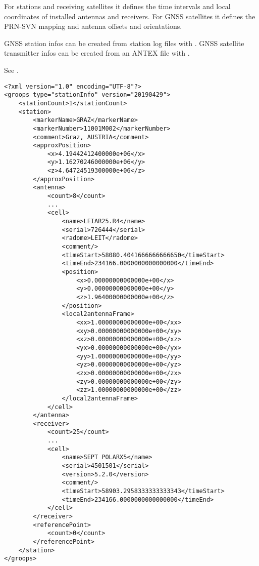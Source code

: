 For stations and receiving satellites it defines the time intervals and
local coordinates of installed antennas and receivers.
For GNSS satellites it defines the PRN-SVN mapping and antenna offsets
and orientations.

GNSS station infos can be created from station log files with
. GNSS satellite transmitter infos
can be created from an ANTEX file with .

See .

\begin{verbatim}
<?xml version="1.0" encoding="UTF-8"?>
<groops type="stationInfo" version="20190429">
    <stationCount>1</stationCount>
    <station>
        <markerName>GRAZ</markerName>
        <markerNumber>11001M002</markerNumber>
        <comment>Graz, AUSTRIA</comment>
        <approxPosition>
            <x>4.19442412400000e+06</x>
            <y>1.16270246000000e+06</y>
            <z>4.64724519300000e+06</z>
        </approxPosition>
        <antenna>
            <count>8</count>
            ...
            <cell>
                <name>LEIAR25.R4</name>
                <serial>726444</serial>
                <radome>LEIT</radome>
                <comment/>
                <timeStart>58080.4041666666666650</timeStart>
                <timeEnd>234166.0000000000000000</timeEnd>
                <position>
                    <x>0.00000000000000e+00</x>
                    <y>0.00000000000000e+00</y>
                    <z>1.96400000000000e+00</z>
                </position>
                <local2antennaFrame>
                    <xx>1.00000000000000e+00</xx>
                    <xy>0.00000000000000e+00</xy>
                    <xz>0.00000000000000e+00</xz>
                    <yx>0.00000000000000e+00</yx>
                    <yy>1.00000000000000e+00</yy>
                    <yz>0.00000000000000e+00</yz>
                    <zx>0.00000000000000e+00</zx>
                    <zy>0.00000000000000e+00</zy>
                    <zz>1.00000000000000e+00</zz>
                </local2antennaFrame>
            </cell>
        </antenna>
        <receiver>
            <count>25</count>
            ...
            <cell>
                <name>SEPT POLARX5</name>
                <serial>4501501</serial>
                <version>5.2.0</version>
                <comment/>
                <timeStart>58903.2958333333333343</timeStart>
                <timeEnd>234166.0000000000000000</timeEnd>
            </cell>
        </receiver>
        <referencePoint>
            <count>0</count>
        </referencePoint>
    </station>
</groops>
\end{verbatim}


